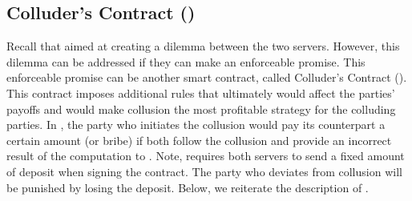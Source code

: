 




\subsection{Colluder's Contract (\SCcc)}

Recall that \SCpc aimed at creating a dilemma between the two servers. However, this dilemma can be addressed if they can make an  enforceable promise.  This enforceable promise can be another smart contract, called Colluder's Contract (\SCcc).  This contract imposes additional rules that ultimately would affect the parties’ payoffs and would make collusion the most profitable strategy for the colluding parties. In \SCcc, the party who initiates the collusion would pay its counterpart a certain amount (or bribe) if both follow the collusion and provide an incorrect result of the computation to \SCpc.  Note, \SCcc requires both servers to send a fixed amount of deposit when signing the contract.  The party who deviates from collusion will be punished by losing the deposit. Below, we reiterate the description of \SCcc. 


